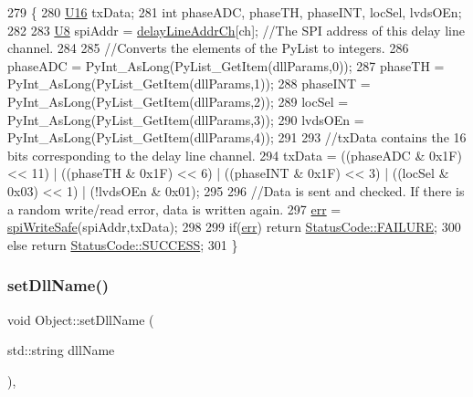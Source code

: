 \begin{DoxyCode}
279 \{                            
280     \hyperlink{ICECALv3_8h_adf928e51a60dba0df29d615401cc55a8}{U16} txData;
281     \textcolor{keywordtype}{int} phaseADC, phaseTH, phaseINT, locSel, lvdsOEn;
282 
283     \hyperlink{ICECALv3_8h_a3cb25ca6f51f003950f9625ff05536fc}{U8} spiAddr = \hyperlink{ICECALv3_8h_a848408b773702d268053cb49d205e097}{delayLineAddrCh}[ch];          \textcolor{comment}{//The SPI address of this delay line
       channel.}
284 
285     \textcolor{comment}{//Converts the elements of the PyList to integers.}
286     phaseADC = PyInt\_AsLong(PyList\_GetItem(dllParams,0));
287     phaseTH  = PyInt\_AsLong(PyList\_GetItem(dllParams,1));
288     phaseINT = PyInt\_AsLong(PyList\_GetItem(dllParams,2));
289     locSel   = PyInt\_AsLong(PyList\_GetItem(dllParams,3));
290     lvdsOEn  = PyInt\_AsLong(PyList\_GetItem(dllParams,4));
291 
293     \textcolor{comment}{//txData contains the 16 bits corresponding to the delay line channel.}
294     txData =  ((phaseADC & 0x1F) << 11) | ((phaseTH & 0x1F) << 6) | ((phaseINT & 0x1F) << 3) | ((locSel & 
      0x03) << 1) | (!lvdsOEn & 0x01);
295 
296     \textcolor{comment}{//Data is sent and checked. If there is a random write/read error, data is written again.}
297     \hyperlink{classICECALv3_ad8989925ee5b3ff322d863ce6aaff0bd}{err} = \hyperlink{classICECALv3_aa0b8358ea0be8e47a8aded5e1551787f}{spiWriteSafe}(spiAddr,txData);  
298 
299     \textcolor{keywordflow}{if}(\hyperlink{classICECALv3_ad8989925ee5b3ff322d863ce6aaff0bd}{err}) \textcolor{keywordflow}{return} \hyperlink{classStatusCode_a6f565cbeadc76d14c72f047e5e85eb4ba3da73d4c469762eb9d3c960368252b26}{StatusCode::FAILURE};
300     \textcolor{keywordflow}{else}        \textcolor{keywordflow}{return} \hyperlink{classStatusCode_a6f565cbeadc76d14c72f047e5e85eb4badd0da38d3ba0d922efd1f4619bc37ad8}{StatusCode::SUCCESS};
301 \}
\end{DoxyCode}
\mbox{\label{classObject_a870c5af919958c2136623b2d7816d123}} 
\subsubsection{\texorpdfstring{set\+Dll\+Name()}{setDllName()}}
{\footnotesize\ttfamily void Object\+::set\+Dll\+Name (\begin{DoxyParamCaption}\item[{std\+::string}]{dll\+Name }\end{DoxyParamCaption})\hspace{0.3cm}{\ttfamily [inline]}, {\ttfamily [inherited]}}

